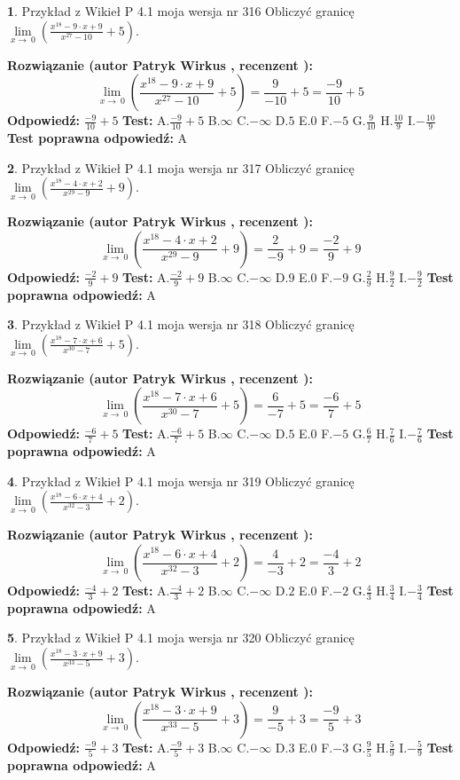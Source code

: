 \documentclass[12pt, a4paper]{article}
\theoremstyle{definition} %
\newtheorem{zad}{}
\newcommand{\zadStart}[1]{\begin{zad}#1\newline}
\newcommand{\zadStop}{\end{zad}}
\newcommand{\rozwStart}[2]{\noindent \textbf{Rozwiązanie (autor #1 , recenzent #2): }\newline}
\newcommand{\rozwStop}{\newline}
\newcommand{\odpStart}{\noindent \textbf{Odpowiedź:}\newline}
\newcommand{\odpStop}{\newline}
\newcommand{\testStart}{\noindent \textbf{Test:}\newline}
\newcommand{\testStop}{\newline}
\newcommand{\kluczStart}{\noindent \textbf{Test poprawna odpowiedź:}\newline}
\newcommand{\kluczStop}{\newline}
\begin{document}
\zadStart{Przykład z Wikieł P 4.1 moja wersja nr 316}
Obliczyć granicę $\lim\limits_{x\to\ 0}(\frac{x^{18}-9 \cdot x +9}{x^{27}-10}+5)$.
\zadStop
\rozwStart{Patryk Wirkus}{}
$$\lim\limits_{x\to\ 0}(\frac{x^{18}-9 \cdot x +9}{x^{27}-10}+5)=\frac{9}{-10}+5=\frac{-9}{10}+5$$
\rozwStop
\odpStart
$\frac{-9}{10}+5$
\odpStop
\testStart
A.$\frac{-9}{10}+5$
B.$\infty$
C.$-\infty$
D.$5$
E.$0$
F.$-5$
G.$\frac{9}{10}$
H.$\frac{10}{9}$
I.$-\frac{10}{9}$
\testStop
\kluczStart
A
\kluczStop



\zadStart{Przykład z Wikieł P 4.1 moja wersja nr 317}
Obliczyć granicę $\lim\limits_{x\to\ 0}(\frac{x^{18}-4 \cdot x +2}{x^{29}-9}+9)$.
\zadStop
\rozwStart{Patryk Wirkus}{}
$$\lim\limits_{x\to\ 0}(\frac{x^{18}-4 \cdot x +2}{x^{29}-9}+9)=\frac{2}{-9}+9=\frac{-2}{9}+9$$
\rozwStop
\odpStart
$\frac{-2}{9}+9$
\odpStop
\testStart
A.$\frac{-2}{9}+9$
B.$\infty$
C.$-\infty$
D.$9$
E.$0$
F.$-9$
G.$\frac{2}{9}$
H.$\frac{9}{2}$
I.$-\frac{9}{2}$
\testStop
\kluczStart
A
\kluczStop



\zadStart{Przykład z Wikieł P 4.1 moja wersja nr 318}
Obliczyć granicę $\lim\limits_{x\to\ 0}(\frac{x^{18}-7 \cdot x +6}{x^{30}-7}+5)$.
\zadStop
\rozwStart{Patryk Wirkus}{}
$$\lim\limits_{x\to\ 0}(\frac{x^{18}-7 \cdot x +6}{x^{30}-7}+5)=\frac{6}{-7}+5=\frac{-6}{7}+5$$
\rozwStop
\odpStart
$\frac{-6}{7}+5$
\odpStop
\testStart
A.$\frac{-6}{7}+5$
B.$\infty$
C.$-\infty$
D.$5$
E.$0$
F.$-5$
G.$\frac{6}{7}$
H.$\frac{7}{6}$
I.$-\frac{7}{6}$
\testStop
\kluczStart
A
\kluczStop



\zadStart{Przykład z Wikieł P 4.1 moja wersja nr 319}
Obliczyć granicę $\lim\limits_{x\to\ 0}(\frac{x^{18}-6 \cdot x +4}{x^{32}-3}+2)$.
\zadStop
\rozwStart{Patryk Wirkus}{}
$$\lim\limits_{x\to\ 0}(\frac{x^{18}-6 \cdot x +4}{x^{32}-3}+2)=\frac{4}{-3}+2=\frac{-4}{3}+2$$
\rozwStop
\odpStart
$\frac{-4}{3}+2$
\odpStop
\testStart
A.$\frac{-4}{3}+2$
B.$\infty$
C.$-\infty$
D.$2$
E.$0$
F.$-2$
G.$\frac{4}{3}$
H.$\frac{3}{4}$
I.$-\frac{3}{4}$
\testStop
\kluczStart
A
\kluczStop



\zadStart{Przykład z Wikieł P 4.1 moja wersja nr 320}
Obliczyć granicę $\lim\limits_{x\to\ 0}(\frac{x^{18}-3 \cdot x +9}{x^{33}-5}+3)$.
\zadStop
\rozwStart{Patryk Wirkus}{}
$$\lim\limits_{x\to\ 0}(\frac{x^{18}-3 \cdot x +9}{x^{33}-5}+3)=\frac{9}{-5}+3=\frac{-9}{5}+3$$
\rozwStop
\odpStart
$\frac{-9}{5}+3$
\odpStop
\testStart
A.$\frac{-9}{5}+3$
B.$\infty$
C.$-\infty$
D.$3$
E.$0$
F.$-3$
G.$\frac{9}{5}$
H.$\frac{5}{9}$
I.$-\frac{5}{9}$
\testStop
\kluczStart
A
\kluczStop
\end{document}
